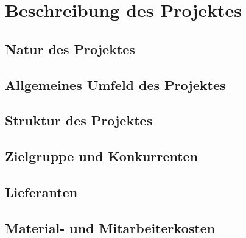 \chapter{Beschreibung des Projektes}

\section{Natur des Projektes}

\section{Allgemeines Umfeld des Projektes}

\section{Struktur des Projektes}

\section{Zielgruppe und Konkurrenten}

\section{Lieferanten}

\section{Material- und Mitarbeiterkosten}
